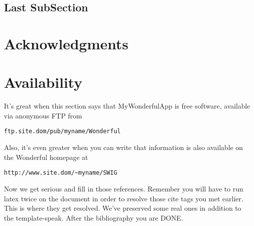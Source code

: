\documentclass[letterpaper,twocolumn,10pt]{article}
\begin{document}
\subsection{Last SubSection}


\section{Acknowledgments}


\section{Availability}

It's great when this section says that MyWonderfulApp is free software, 
available via anonymous FTP from

\begin{center}
{\tt ftp.site.dom/pub/myname/Wonderful}\\
\end{center}

Also, it's even greater when you can write that information is also 
available on the Wonderful homepage at 

\begin{center}
{\tt http://www.site.dom/\~{}myname/SWIG}
\end{center}

Now we get serious and fill in those references.  Remember you will
have to run latex twice on the document in order to resolve those
cite tags you met earlier.  This is where they get resolved.
We've preserved some real ones in addition to the template-speak.
After the bibliography you are DONE.

{\footnotesize 
}


\end{document}
